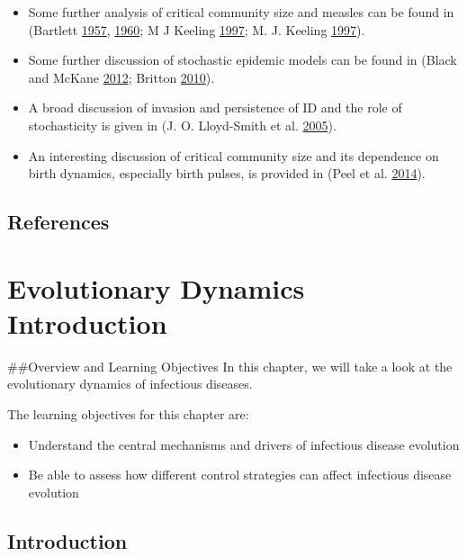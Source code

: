 \documentclass[]{book}
\providecommand{\tightlist}{%
  \setlength{\itemsep}{0pt}\setlength{\parskip}{0pt}}
\theoremstyle{definition}
\theoremstyle{definition}
\theoremstyle{definition}
\theoremstyle{remark}
\begin{document}
\begin{itemize}
\tightlist
\item
  Some further analysis of critical community size and measles can be
  found in (Bartlett \protect\hyperlink{ref-bartlett57}{1957},
  \protect\hyperlink{ref-bartlett60}{1960}; M J Keeling
  \protect\hyperlink{ref-keeling97}{1997}; M. J. Keeling
  \protect\hyperlink{ref-keeling97a}{1997}).
\item
  Some further discussion of stochastic epidemic models can be found in
  (Black and McKane \protect\hyperlink{ref-black12}{2012}; Britton
  \protect\hyperlink{ref-britton10a}{2010}).
\item
  A broad discussion of invasion and persistence of ID and the role of
  stochasticity is given in (J. O. Lloyd-Smith et al.
  \protect\hyperlink{ref-lloyd-smith05b}{2005}).
\item
  An interesting discussion of critical community size and its
  dependence on birth dynamics, especially birth pulses, is provided in
  (Peel et al. \protect\hyperlink{ref-peel14}{2014}).
\end{itemize}

\hypertarget{references-2}{%
\section{References}\label{references-2}}

\hypertarget{evolutionary-dynamics-introduction}{%
\chapter{Evolutionary Dynamics
Introduction}\label{evolutionary-dynamics-introduction}}

\#\#Overview and Learning Objectives In this chapter, we will take a
look at the evolutionary dynamics of infectious diseases.

The learning objectives for this chapter are:

\begin{itemize}
\tightlist
\item
  Understand the central mechanisms and drivers of infectious disease
  evolution
\item
  Be able to assess how different control strategies can affect
  infectious disease evolution
\end{itemize}

\hypertarget{introduction-8}{%
\section{Introduction}\label{introduction-8}}
\end{document}
